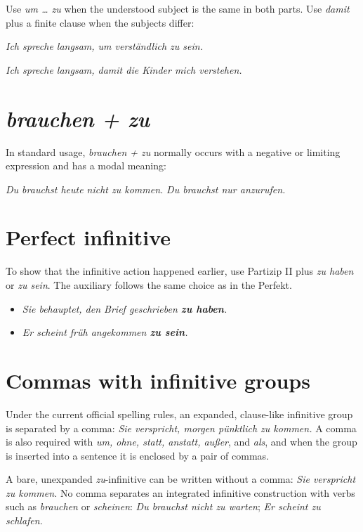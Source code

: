Use \textit{um \ldots{} zu} when the understood subject is the same in both
parts. Use \textit{damit} plus a finite clause when the subjects differ:

\begin{center}
\textit{Ich spreche langsam, um verständlich zu sein.}

\textit{Ich spreche langsam, damit die Kinder mich verstehen.}
\end{center}

\section{\textit{brauchen + zu}}

In standard usage, \textit{brauchen + zu} normally occurs with a negative or
limiting expression and has a modal meaning:

\begin{center}
\textit{Du brauchst heute nicht zu kommen.}
\qquad
\textit{Du brauchst nur anzurufen.}
\end{center}

\section{Perfect infinitive}

To show that the infinitive action happened earlier, use Partizip II plus
\textit{zu haben} or \textit{zu sein}. The auxiliary follows the same choice
as in the Perfekt.

\begin{itemize}[leftmargin=*]
  \item \textit{Sie behauptet, den Brief geschrieben \textbf{zu haben}.}
  \item \textit{Er scheint früh angekommen \textbf{zu sein}.}
\end{itemize}

\section{Commas with infinitive groups}

Under the current official spelling rules, an expanded, clause-like
infinitive group is separated by a comma:
\textit{Sie verspricht, morgen pünktlich zu kommen.} A comma is also required
with \textit{um, ohne, statt, anstatt, außer}, and \textit{als}, and when the
group is inserted into a sentence it is enclosed by a pair of commas.

A bare, unexpanded \textit{zu}-infinitive can be written without a comma:
\textit{Sie verspricht zu kommen.} No comma separates an integrated infinitive
construction with verbs such as \textit{brauchen} or \textit{scheinen}:
\textit{Du brauchst nicht zu warten}; \textit{Er scheint zu schlafen}.

